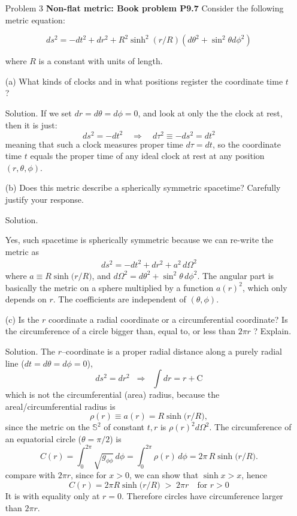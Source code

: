 \documentclass[12pt]{article}
\begin{document}
\begin{enumerate}
  \item[Problem 3] \textbf{Non-flat metric: Book problem P9.7} Consider the following metric equation:
  
  $$
  d s^2=-d t^2+d r^2+R^2 \sinh ^2(r / R)\left(d \theta^2+\sin ^2 \theta d \phi^2\right)
  $$
  
  where $R$ is a constant with units of length.
  \item[(a)] What kinds of clocks and in what positions register the coordinate time $t$ ?
  
  \item[Solution.]
  If we set $dr=d\theta=d\phi=0$, and look at only the the clock at rest, then it is just:
  \[
    ds^2 = -dt^2 \quad\Longrightarrow\quad d\tau^2 \equiv -ds^2 = dt^2
  \]
  meaning that such a clock measures proper time $d\tau=dt$, so the coordinate time $t$ equals the proper time of any ideal clock at rest at any position $(r,\theta,\phi)$.

  
  \item[(b)] Does this metric describe a spherically symmetric spacetime? Carefully justify your response.

  \item[Solution.]
  
  Yes, such spacetime is spherically symmetric because we can re-write the metric as
  \[
  \begin{aligned}
    ds^2 = -dt^2 + dr^2 + a^2\, d\Omega^2 
  \end{aligned}
  \]
  where $a\equiv R\sinh\!\big(r/R\big)$, and $d\Omega^2 = d\theta^2+\sin^2\!\theta\,d\phi^2$.
  The angular part is basically the metric on a sphere multiplied by a function $a(r)^2$, which only depends on $r$. The coefficients are independent of $(\theta,\phi)$. 

  \item[(c)] Is the $r$ coordinate a radial coordinate or a circumferential coordinate? Is the circumference of a circle bigger than, equal to, or less than $2 \pi r$ ? Explain.
  
  \item[Solution.]
  The $r$–coordinate is a proper radial distance along a purely radial line ($dt=d\theta=d\phi=0$),
  \[
    ds^2 = dr^2 \;\;\Longrightarrow\;\; \int dr = r + \text{C}
  \]
  which is not the circumferential (area) radius, because the areal/circumferential radius is
  \[
    \rho(r) \equiv a(r) = R\sinh\!\big(r/R\big),
  \]
  since the metric on the $\mathbb{S}^2$ of constant $t,r$ is $\rho(r)^2 d\Omega^2$. The circumference of an equatorial circle ($\theta=\pi/2$) is
  \[
    C(r) = \int_0^{2\pi}\!\sqrt{g_{\phi\phi}}\,d\phi
          = \int_0^{2\pi}\!\rho(r)\,d\phi
          = 2\pi\,R\sinh\!\big(r/R\big).
  \]
  compare with $2\pi r$, since for $x>0$, we can show that $\sinh x > x$, hence
  \[
    C(r)=2\pi R\sinh\!\big(r/R\big) \;>\; 2\pi r \quad\text{for } r>0
  \]
  It is with equality only at $r=0$. Therefore circles have circumference larger than $2\pi r$.


\end{enumerate}
\end{document}
